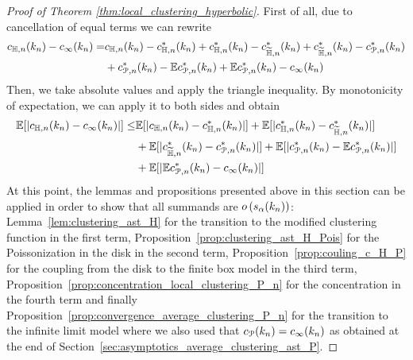 \begin{proof}[Proof of Theorem \ref{thm:local_clustering_hyperbolic}]
First of all, due to cancellation of equal terms we can rewrite
\begin{align*}
    c_{\mathbb{H},n}(k_n)-c_\infty(k_n) =& c_{\mathbb{H},n}(k_n)-c_{\mathbb{H},n}^\ast(k_n)+c_{\mathbb{H},n}^\ast(k_n)-c_{\widetilde{\mathbb{H}},n}^\ast(k_n)+c_{\widetilde{\mathbb{H}},n}^\ast(k_n)-c_{{\mathcal P},n}^\ast(k_n) \\
    &+c_{{\mathcal P},n}^\ast(k_n)-\mathbb{E} c_{{\mathcal P},n}^\ast(k_n)+\mathbb{E} c_{{\mathcal P},n}^\ast(k_n)-c_\infty(k_n)
\end{align*}
Then, we take absolute values and apply the triangle inequality. By monotonicity of expectation, we can apply it to both sides and obtain
\begin{align*}
    \mathbb{E}[|c_{\mathbb{H},n}(k_n)-c_\infty(k_n)|] \leq & \mathbb{E}[|c_{\mathbb{H},n}(k_n)-c_{\mathbb{H},n}^\ast(k_n)|]+\mathbb{E}[|c_{\mathbb{H},n}^\ast(k_n)-c_{\widetilde{\mathbb{H}},n}^\ast(k_n)|]\\&+\mathbb{E}[|c_{\widetilde{\mathbb{H}},n}^\ast(k_n)-c_{{\mathcal P},n}^\ast(k_n)|] 
    +\mathbb{E}[|c_{{\mathcal P},n}^\ast(k_n)-\mathbb{E} c_{{\mathcal P},n}^\ast(k_n)|]\\&+\mathbb{E}[|\mathbb{E} c_{{\mathcal P},n}^\ast(k_n)-c_\infty(k_n)|]
\end{align*}
At this point, the lemmas and propositions presented above in this section can be applied in order to show that all summands are $o\left(s_\alpha(k_n)\right)$: Lemma~\ref{lem:clustering_ast_H} for the transition to the modified clustering function in the first term, Proposition~\ref{prop:clustering_ast_H_Pois} for the Poissonization in the disk in the second term, Proposition~\ref{prop:couling_c_H_P} for the coupling from the disk to the finite box model in the third term, Proposition~\ref{prop:concentration_local_clustering_P_n} for the concentration in the fourth term and finally Proposition~\ref{prop:convergence_average_clustering_P_n} for the transition to the infinite limit model where we also used that $c_{{\mathcal P}}(k_n) = c_\infty(k_n)$ as obtained at the end of Section~\ref{sec:asymptotics_average_clustering_ast_P}.

\end{proof}
